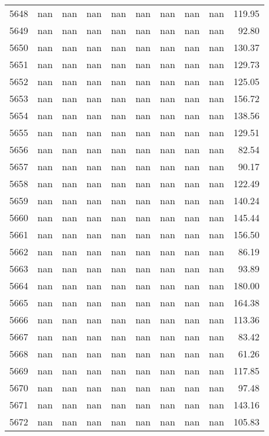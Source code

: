 \begin{tabular}{lrrrrrrrrr}
5648 & nan & nan & nan & nan & nan & nan & nan & nan & 119.95 \\
5649 & nan & nan & nan & nan & nan & nan & nan & nan & 92.80 \\
5650 & nan & nan & nan & nan & nan & nan & nan & nan & 130.37 \\
5651 & nan & nan & nan & nan & nan & nan & nan & nan & 129.73 \\
5652 & nan & nan & nan & nan & nan & nan & nan & nan & 125.05 \\
5653 & nan & nan & nan & nan & nan & nan & nan & nan & 156.72 \\
5654 & nan & nan & nan & nan & nan & nan & nan & nan & 138.56 \\
5655 & nan & nan & nan & nan & nan & nan & nan & nan & 129.51 \\
5656 & nan & nan & nan & nan & nan & nan & nan & nan & 82.54 \\
5657 & nan & nan & nan & nan & nan & nan & nan & nan & 90.17 \\
5658 & nan & nan & nan & nan & nan & nan & nan & nan & 122.49 \\
5659 & nan & nan & nan & nan & nan & nan & nan & nan & 140.24 \\
5660 & nan & nan & nan & nan & nan & nan & nan & nan & 145.44 \\
5661 & nan & nan & nan & nan & nan & nan & nan & nan & 156.50 \\
5662 & nan & nan & nan & nan & nan & nan & nan & nan & 86.19 \\
5663 & nan & nan & nan & nan & nan & nan & nan & nan & 93.89 \\
5664 & nan & nan & nan & nan & nan & nan & nan & nan & 180.00 \\
5665 & nan & nan & nan & nan & nan & nan & nan & nan & 164.38 \\
5666 & nan & nan & nan & nan & nan & nan & nan & nan & 113.36 \\
5667 & nan & nan & nan & nan & nan & nan & nan & nan & 83.42 \\
5668 & nan & nan & nan & nan & nan & nan & nan & nan & 61.26 \\
5669 & nan & nan & nan & nan & nan & nan & nan & nan & 117.85 \\
5670 & nan & nan & nan & nan & nan & nan & nan & nan & 97.48 \\
5671 & nan & nan & nan & nan & nan & nan & nan & nan & 143.16 \\
5672 & nan & nan & nan & nan & nan & nan & nan & nan & 105.83 \\

\end{tabular}
